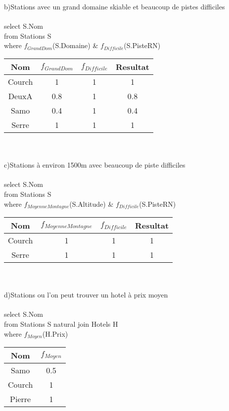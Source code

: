 \documentclass[10pt,a4paper]{report}
\begin{document}
b)Stations avec un grand domaine skiable et beaucoup de pistes difficiles\\\\
select S.Nom\\ 
from Stations S\\
where $f_{GrandDom}$(S.Domaine) \& $f_{Difficile}$(S.PisteRN)\\

\begin{tabular}{|c|c|c|c|}
\hline 
Nom & $f_{GrandDom}$ & $f_{Difficile}$ & Resultat \\ 
\hline 
Courch & 1 & 1 & 1 \\ 
\hline 
DeuxA & 0.8 & 1 & 0.8 \\ 
\hline 
Samo & 0.4 & 1 & 0.4 \\ 
\hline 
Serre & 1 & 1 & 1 \\ 
\hline 
\end{tabular}\\\\

c)Stations à environ 1500m avec beaucoup de piste difficiles\\\\
select S.Nom\\ 
from Stations S\\
where $f_{MoyenneMontagne}$(S.Altitude) \& $f_{Difficile}$(S.PisteRN)\\

\begin{tabular}{|c|c|c|c|}
\hline 
Nom & $f_{MoyenneMontagne}$ & $f_{Difficile}$ & Resultat \\ 
\hline 
Courch & 1 & 1 & 1 \\ 
\hline 
Serre & 1 & 1 & 1 \\ 
\hline 
\end{tabular}\\\\

d)Stations ou l'on peut trouver un hotel à prix moyen\\\\
select S.Nom\\ 
from Stations S natural join Hotels H\\
where $f_{Moyen}$(H.Prix) \\

\begin{tabular}{|c|c|}
\hline 
Nom & $f_{Moyen}$ \\ 
\hline 
Samo & 0.5 \\ 
\hline 
Courch & 1 \\ 
\hline 
Pierre & 1 \\ 
\hline 
\end{tabular}\\
\end{document}
